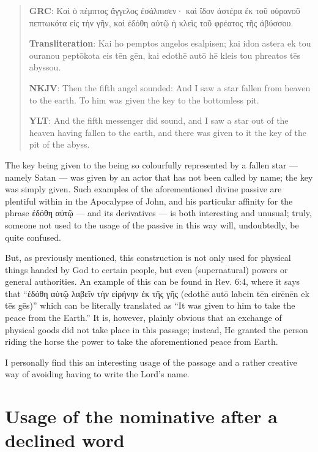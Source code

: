 \begin{quote}

\textbf{GRC}: Καὶ ὁ πέμπτος ἄγγελος ἐσάλπισεν· καὶ ἴδον ἀστέρα ἐκ τοῦ οὐρανοῦ πεπτωκότα εἰς τὴν γῆν, καὶ ἐδόθη αὐτῷ ἡ κλεὶς τοῦ φρέατος τῆς ἀβύσσου. 

\textbf{Transliteration}: Kai ho pemptos angelos esalpisen; kai idon astera ek tou ouranou peptōkota eis tēn gēn, kai edothē autō hē kleis tou phreatos tēs abyssou. 

\bigskip

\textbf{NKJV}: Then the fifth angel sounded: And I saw a star fallen from heaven to the earth. To him was given the key to the bottomless pit. 

\textbf{YLT}: And the fifth messenger did sound, and I saw a star out of the heaven having fallen to the earth, and there was given to it the key of the pit of the abyss.
\end{quote}

The key being given to the being so colourfully represented by a fallen star — namely Satan — was given by an actor that has not been called by name; the key was simply given. Such examples of the aforementioned divine passive are plentiful within in the Apocalypse of John, and his particular affinity for the phrase ἐδόθη αὐτῷ — and its derivatives — is both interesting and unusual; truly, someone not used to the usage of the passive in this way will, undoubtedly, be quite confused.

But, as previously mentioned, this construction is not only used for physical things handed by God to certain people, but even (supernatural) powers or general authorities. An example of this can be found in Rev. 6:4, where it says that “ἐδόθη αὐτῷ λαβεῖν τὴν εἰρήνην ἐκ τῆς γῆς (edothē autō labein tēn eirēnēn ek tēs gēs)” which can be literally translated as “It was given to him to take the peace from the Earth.” It is, however, plainly obvious that an exchange of physical goods did not take place in this passage; instead, He granted the person riding the horse the power to take the aforementioned peace from Earth.

I personally find this an interesting usage of the passage and a rather creative way of avoiding having to write the Lord’s name.

\section*{Usage of the nominative after a declined word}
  
